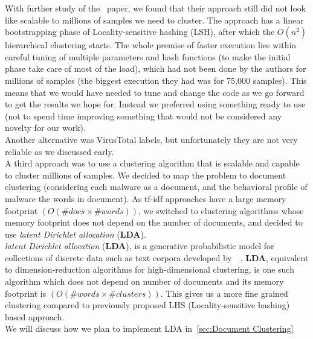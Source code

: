 With further study of the~\cite[Bayer]{bayer} paper, we found that their approach still did not look like scalable to millions of samples we need to cluster.
The approach has a linear bootstrapping phase of Locality-sensitive hashing (LSH), after which the $O(n^2)$ hierarchical clustering starts.
The whole premise of faster execution lies within careful tuning of multiple parameters and hash functions (to make the initial phase take care of most of the load), which had not been done by the authors for millions of samples (the biggest execution they had was for 75,000 samples).
This means that we would have needed to tune and change the code as we go forward to get the results we hope for.
Instead we preferred using something ready to use (not to spend time improving something that would not be considered any novelty for our work).
\\
Another alternative was VirusTotal labels, but unfortunately they are not very reliable as we discussed early.
\\
A third approach was to use a clustering algorithm that is scalable and capable to cluster millions of samples.
We decided to map the problem to document clustering (considering each malware as a document, and the behavioral profile of malware the words in document).
As {tf-idf} approaches have a large memory footprint $(O(\#docs \times \#words))$, we switched to clustering algorithms whose memory footprint does not depend on the number of documents, and decided to use \textit{latent Dirichlet allocation} (\textbf{LDA}).
\\
\textit{latent Dirichlet allocation} (\textbf{LDA}), is a generative probabilistic model for collections of discrete data such as text corpora developed by~\citeauthor{Blei}~\cite[LDA]{Blei}.
\textbf{LDA}, equivalent to dimension-reduction algorithms for high-dimensional clustering, is one such algorithm which does not depend on number of documents and its memory footprint is $(O(\#words\times \#clusters))$.
This gives us a more fine grained clustering compared to previously proposed LHS (Locality-sensitive hashing) based approach.\\
We will discuss how we plan to implement LDA in~\autoref{sec:Document Clustering}
